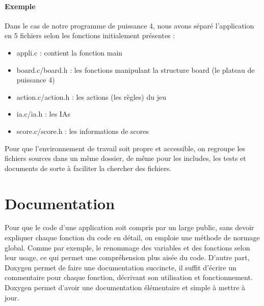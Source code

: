 \documentclass{report}
\begin{document}
\paragraph{Exemple}
Dans le cas de notre programme de puissance 4, nous avons séparé l'application en 5 fichiers selon les fonctions initialement présentes :
\begin{itemize}
\item appli.c : contient la fonction main
\item board.c/board.h : les fonctions manipulant la structure board (le plateau de puissance 4)
\item action.c/action.h : les actions (les règles) du jeu
\item ia.c/ia.h : les IAs
\item score.c/score.h : les informations de scores
\end{itemize} 
Pour que l'environnement de travail soit propre et accessible, on regroupe les fichiers sources dans un même dossier, de même pour les includes, les tests et documents de sorte à faciliter la chercher des fichiers.


\section{Documentation}
Pour que le code d'une application soit compris par un large public, sans devoir expliquer chaque fonction du code en détail, on emploie une méthode de normage global. Comme par exemple, le renommage des variables et des fonctions selon leur usage, ce qui permet une compréhension plus aisée du code. D'autre part, Doxygen permet de faire une documentation succincte, il suffit d'écrire un commentaire pour chaque fonction, décrivant son utilisation et fonctionnement. Doxygen permet d'avoir une documentation élémentaire et simple à mettre à jour.
\end{document}
